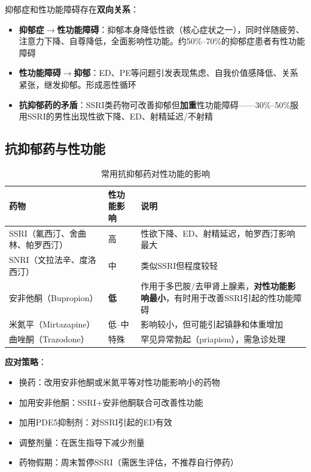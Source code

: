 \documentclass[12pt,a4paper,twoside]{ctexbook}
\begin{document}
抑郁症和性功能障碍存在\textbf{双向关系}：

\begin{itemize}[leftmargin=2cm]
	\item \textbf{抑郁症$\rightarrow$性功能障碍}：抑郁本身降低性欲（核心症状之一），同时伴随疲劳、注意力下降、自尊降低，全面影响性功能。约50\%--70\%的抑郁症患者有性功能障碍
	\item \textbf{性功能障碍$\rightarrow$抑郁}：ED、PE等问题引发表现焦虑、自我价值感降低、关系紧张，继发抑郁。形成恶性循环
	\item \textbf{抗抑郁药的矛盾}：SSRI类药物可改善抑郁但\textbf{加重}性功能障碍——30\%--50\%服用SSRI的男性出现性欲下降、ED、射精延迟/不射精
\end{itemize}

\subsection{抗抑郁药与性功能}

\begin{table}[htbp]
\centering
\caption{常用抗抑郁药对性功能的影响}
\label{tab:antidepressants_sexual}
\begin{tabularx}{\textwidth}{@{}llX@{}}
    \toprule
    \textbf{药物} & \textbf{性功能影响} & \textbf{说明} \\
    \midrule
    SSRI（氟西汀、舍曲林、帕罗西汀） & 高 & 性欲下降、ED、射精延迟，帕罗西汀影响最大 \\
    SNRI（文拉法辛、度洛西汀） & 中 & 类似SSRI但程度较轻 \\
    安非他酮（Bupropion） & \textbf{低} & 作用于多巴胺/去甲肾上腺素，\textbf{对性功能影响最小}，有时用于改善SSRI引起的性功能障碍 \\
    米氮平（Mirtazapine） & 低--中 & 影响较小，但可能引起镇静和体重增加 \\
    曲唑酮（Trazodone） & 特殊 & 罕见异常勃起（priapism），需急诊处理 \\
    \bottomrule
\end{tabularx}
\end{table}

\textbf{应对策略}：
\begin{itemize}[leftmargin=2cm]
	\item 换药：改用安非他酮或米氮平等对性功能影响小的药物
	\item 加用安非他酮：SSRI+安非他酮联合可改善性功能
	\item 加用PDE5抑制剂：对SSRI引起的ED有效
	\item 调整剂量：在医生指导下减少剂量
	\item 药物假期：周末暂停SSRI（需医生评估，不推荐自行停药）
\end{itemize}
\end{document}
